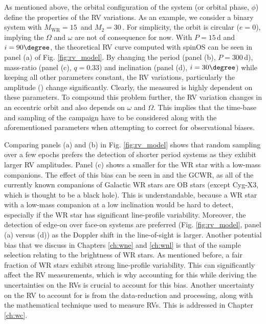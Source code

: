 As mentioned above, the orbital configuration of the system (or orbital phase, $\phi$) define the properties of the RV variations. As an example, we consider a binary system with $M_{\textrm{WR}} = 15\,$\Msun{} and $M_2 = 30\,$\Msun{}. For simplicity, the orbit is circular ($e=0$), implying the $\Omega$ and $\omega$ are not of consequence for now. With $P=15\,$d and $i=90\degree$, the theoretical RV curve computed with spinOS \citep{2021Fabry} can be seen in panel (a) of Fig. \ref{fig:rv_model}. By changing the period (panel (b), $P=300\,$d), mass-ratio (panel (c), $q=0.33$) and inclination (panel (d), $i=30\degree$) while keeping all other parameters constant, the RV variations, particularly the amplitude (\DelRV{}) change significantly. Clearly, the measured \DelRV{} is highly dependent on these parameters. To compound this problem further, the RV variation changes in an eccentric orbit and also depends on $\omega$ and $\Omega$. This implies that the time-base and sampling of the campaign have to be considered along with the aforementioned parameters when attempting to correct for observational biases.

Comparing panels (a) and (b) in Fig. \ref{fig:rv_model} shows that random sampling over a few epochs prefers the detection of shorter period systems as they exhibit larger RV amplitudes. Panel (c) shows a smaller \DelRV{} for the WR star with a low-mass companions. The effect of this bias can be seen in  and the GCWR, as all of the currently known companions of Galactic WR stars are OB stars (except Cyg-X3, which is thought to be a black hole). This is understandable, because a WR star with a low-mass companion at a low inclination would be hard to detect, especially if the WR star has significant line-profile variability. Moreover, the detection of edge-on over face-on systems are preferred (Fig. \ref{fig:rv_model}, panel (a) versus (d)) as the Doppler shift in the line-of-sight is larger. Another potential bias that we discuss in Chapters \ref{ch:wne} and \ref{ch:wnl} is that of the sample selection relating to the brightness of WR stars. As mentioned before, a fair fraction of WR stars exhibit strong line-profile variability. This can significantly affect the RV measurements, which is why accounting for this while deriving the uncertainties on the RVs is crucial to account for this bias. Another uncertainty on the RV to account for is from the data-reduction and processing, along with the mathematical technique used to measure RVs. This is addressed in Chapter \ref{ch:wc}. 

